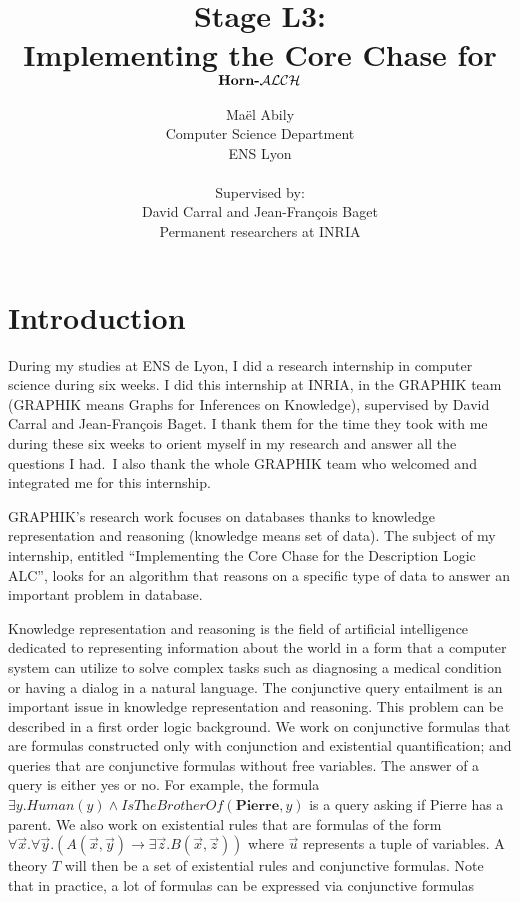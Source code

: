 \documentclass{article}
\title{Stage L3: \\ Implementing the Core Chase for $\textbf{Horn-$\mathcal{ALCH}$}$}
\author{Maël Abily \\ Computer Science Department \\ ENS Lyon \\ \\ Supervised by: \\ David Carral and Jean-François Baget \\ Permanent researchers at INRIA}
\theoremstyle{definition}
\theoremstyle{remark}
\begin{document}
\maketitle						%



\newpage

\tableofcontents

\section{Introduction}

During my studies at ENS de Lyon, I did a research internship in computer science during six weeks. I did this internship at INRIA, in the GRAPHIK team (GRAPHIK means Graphs for Inferences on Knowledge), supervised by David Carral and Jean-François Baget. I thank them for the time they took with me during these six weeks to orient myself in my research and answer all the
questions I had.\ I also thank the whole GRAPHIK team who welcomed and integrated me for this internship. 

GRAPHIK's research work focuses on databases thanks to knowledge representation and reasoning (knowledge means set of data). The subject of my internship, entitled ``Implementing the Core Chase for the Description Logic ALC'', looks for an algorithm that reasons on a specific type of data to answer an important problem in database.


Knowledge representation and reasoning is the field of artificial intelligence dedicated to representing information about the world in a form that a computer system can utilize to solve complex tasks such as diagnosing a medical condition or having a dialog in a natural language.  The conjunctive query entailment is an important issue in knowledge representation and reasoning. This problem can be described in a first order logic background. We work on conjunctive formulas that are formulas constructed only with conjunction and existential quantification; and queries that are conjunctive formulas without free variables. The answer of a query is either yes or no. For example, the formula $ \exists y. \textit{Human}(y) \wedge \textit{IsTheBrotherOf}(\textbf{Pierre},y)$ is a query asking
if Pierre has a parent. We also work on existential rules that are formulas of the form $\forall \vec x.\forall \vec y.( A(\vec x,\vec y) \rightarrow \exists \vec z. B(\vec x,\vec z))$ where $\vec u$ represents a tuple of variables. A theory $T$ will then be a set of existential rules and conjunctive formulas. Note that in practice, a lot of formulas can be expressed via conjunctive formulas
\end{document}
